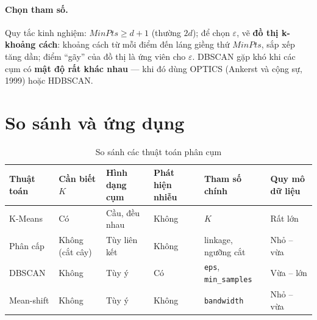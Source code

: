 \paragraph{Chọn tham số.} Quy tắc kinh nghiệm: $\mathit{MinPts} \geq d + 1$ (thường $2d$); để chọn $\varepsilon$, vẽ \textbf{đồ thị k-khoảng cách}: khoảng cách từ mỗi điểm đến láng giềng thứ $\mathit{MinPts}$, sắp xếp tăng dần; điểm ``gãy'' của đồ thị là ứng viên cho $\varepsilon$. DBSCAN gặp khó khi các cụm có \textbf{mật độ rất khác nhau} --- khi đó dùng OPTICS (Ankerst và cộng sự, 1999) hoặc HDBSCAN.

\section{So sánh và ứng dụng}

\begin{table}[H]
\centering
\small
\begin{tabular}{|p{2.3cm}|p{1.6cm}|p{2.1cm}|p{1.6cm}|p{2.2cm}|p{2.6cm}|}
\hline
\textbf{Thuật toán} & \textbf{Cần biết $K$} & \textbf{Hình dạng cụm} & \textbf{Phát hiện nhiễu} & \textbf{Tham số chính} & \textbf{Quy mô dữ liệu} \\
\hline
K-Means & Có & Cầu, đều nhau & Không & $K$ & Rất lớn \\ \hline
Phân cấp & Không (cắt cây) & Tùy liên kết & Không & linkage, ngưỡng cắt & Nhỏ -- vừa \\ \hline
DBSCAN & Không & Tùy ý & Có & \texttt{eps}, \texttt{min\_samples} & Vừa -- lớn \\ \hline
Mean-shift & Không & Tùy ý & Không & \texttt{bandwidth} & Nhỏ -- vừa \\ \hline
\end{tabular}
\caption{So sánh các thuật toán phân cụm}
\end{table}


